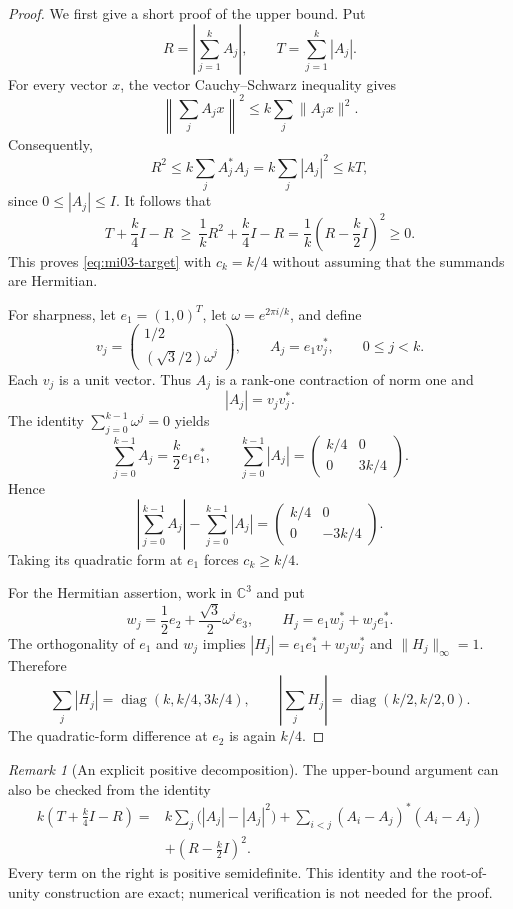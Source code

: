 \documentclass[10pt,a4paper]{article}
\theoremstyle{remark}
\newtheorem{remark}[theorem]{Remark}
\newcommand{\C}{\mathbb C}
\newcommand{\diag}{\operatorname{diag}}
\newcommand{\opnorm}[1]{\lVert #1\rVert_{\infty}}
\begin{document}
\begin{proof}
We first give a short proof of the upper bound. Put
\[
 R=\left|\sum_{j=1}^kA_j\right|,\qquad T=\sum_{j=1}^k|A_j|.
\]
For every vector $x$, the vector Cauchy--Schwarz inequality gives
\[
 \left\|\sum_j A_jx\right\|^2\leq k\sum_j\|A_jx\|^2.
\]
Consequently,
\[
 R^2\leq k\sum_j A_j^*A_j=k\sum_j|A_j|^2\leq kT,
\]
since $0\leq |A_j|\leq I$. It follows that
\[
 T+\frac{k}{4}I-R
 \ \geq\ \frac1kR^2+\frac{k}{4}I-R
 =\frac1k\left(R-\frac{k}{2}I\right)^2\geq0.
\]
This proves \eqref{eq:mi03-target} with $c_k=k/4$ without assuming that the summands are Hermitian.

For sharpness, let $e_1=(1,0)^T$, let $\omega=e^{2\pi i/k}$, and define
\[
 v_j=\begin{pmatrix}1/2\\ (\sqrt3/2)\omega^j\end{pmatrix},
 \qquad A_j=e_1v_j^*,\qquad 0\leq j<k.
\]
Each $v_j$ is a unit vector. Thus $A_j$ is a rank-one contraction of norm one and
\[
 |A_j|=v_jv_j^*.
\]
The identity $\sum_{j=0}^{k-1}\omega^j=0$ yields
\[
 \sum_{j=0}^{k-1} A_j=\frac{k}{2}e_1e_1^*,
 \qquad \sum_{j=0}^{k-1}|A_j|
 =\begin{pmatrix}k/4&0\\0&3k/4\end{pmatrix}.
\]
Hence
\[
 \left|\sum_{j=0}^{k-1} A_j\right|-\sum_{j=0}^{k-1}|A_j|
 =\begin{pmatrix}k/4&0\\0&-3k/4\end{pmatrix}.
\]
Taking its quadratic form at $e_1$ forces $c_k\geq k/4$.

For the Hermitian assertion, work in $\C^3$ and put
\[
 w_j=\frac12e_2+\frac{\sqrt3}{2}\omega^j e_3,
 \qquad H_j=e_1w_j^*+w_je_1^*.
\]
The orthogonality of $e_1$ and $w_j$ implies
$|H_j|=e_1e_1^*+w_jw_j^*$ and $\opnorm{H_j}=1$. Therefore
\[
 \sum_j|H_j|=\diag(k,k/4,3k/4),\qquad
 \left|\sum_jH_j\right|=\diag(k/2,k/2,0).
\]
The quadratic-form difference at $e_2$ is again $k/4$.
\end{proof}

\begin{remark}[An explicit positive decomposition]
The upper-bound argument can also be checked from the identity
\begin{align*}
 k\left(T+\frac{k}{4}I-R\right)
 ={}&k\sum_j\bigl(|A_j|-|A_j|^2\bigr)
   +\sum_{i<j}(A_i-A_j)^*(A_i-A_j)\\
 &+\left(R-\frac{k}{2}I\right)^2.
\end{align*}
Every term on the right is positive semidefinite. This identity and the root-of-unity construction are exact; numerical verification is not needed for the proof.
\end{remark}
\end{document}
